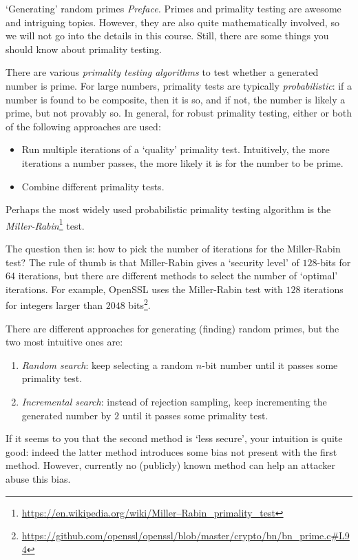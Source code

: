 \documentclass{practice}
\begin{document}
\begin{task}{`Generating' random primes}
  \textit{Preface.}
  Primes and primality testing are awesome and intriguing topics.
  However, they are also quite mathematically involved, so we will not go into the details in this course.
  Still, there are some things you should know about primality testing.

  There are various \emph{primality testing algorithms} to test whether a generated number is prime.
  For large numbers, primality tests are typically \emph{probabilistic}: if a number is found to be composite, then it is so, and if not, the number is likely a prime, but not provably so.
  In general, for robust primality testing, either or both of the following approaches are used:
  \begin{itemize}
    \item Run multiple iterations of a `quality' primality test.
    Intuitively, the more iterations a number passes, the more likely it is for the number to be prime.
    \item Combine different primality tests.
  \end{itemize}

  Perhaps the most widely used probabilistic primality testing algorithm is the \emph{Miller-Rabin}\footnote{\url{https://en.wikipedia.org/wiki/Miller–Rabin_primality_test}} test.
  
  The question then is: how to pick the number of iterations for the Miller-Rabin test?
  The rule of thumb is that Miller-Rabin gives a `security level' of $128$-bits for $64$ iterations, but there are different methods to select the number of `optimal' iterations.
  For example, OpenSSL uses the Miller-Rabin test with $128$ iterations for integers larger than $2048$ bits\footnote{\url{https://github.com/openssl/openssl/blob/master/crypto/bn/bn_prime.c\#L94}}.

  There are different approaches for generating (finding) random primes, but the two most intuitive ones are:
  \begin{enumerate}
    \item \emph{Random search}: keep selecting a random $n$-bit number until it passes some primality test.
    \item \emph{Incremental search}: instead of rejection sampling, keep incrementing the generated number by $2$ until it passes some primality test.
  \end{enumerate}

  If it seems to you that the second method is `less secure', your intuition is quite good: indeed the latter method introduces some bias not present with the first method.
  However, currently no (publicly) known method can help an attacker abuse this bias.


\end{task}
\end{document}
